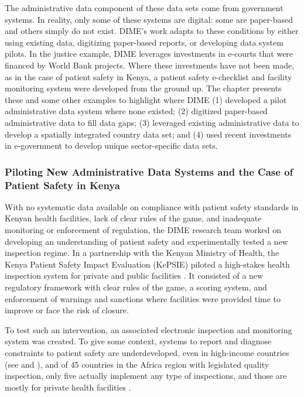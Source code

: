 The administrative data component of these data sets come from government systems. In reality, only some of these systems are digital: some are paper-based and others simply do not exist. DIME's work adapts to these conditions by either using existing data, digitizing paper-based reports, or developing data system pilots. In the justice example, DIME leverages investments in e-courts that were financed by World Bank projects. Where these investments have not been made, as in the case of patient safety in Kenya, a patient safety e-checklist and facility monitoring system were developed from the ground up. The chapter presents these and some other examples to highlight where DIME (1) developed a pilot administrative data system where none existed; (2) digitized paper-based administrative data to fill data gaps; (3) leveraged existing administrative data to develop a spatially integrated country data set; and (4) used recent investments in e-government to develop unique sector-specific data sets.\newpage

\hypertarget{piloting-new-administrative-data-systems-and-the-case-of-patient-safety-in-kenya}{%
\subsubsection{Piloting New Administrative Data Systems and the Case of Patient Safety in Kenya}\label{piloting-new-administrative-data-systems-and-the-case-of-patient-safety-in-kenya}}

With no systematic data available on compliance with patient safety standards in Kenyan health facilities, lack of clear rules of the game, and inadequate monitoring or enforcement of regulation, the DIME research team worked on developing an understanding of patient safety and experimentally tested a new inspection regime. In a partnership with the Kenyan Ministry of Health, the Kenya Patient Safety Impact Evaluation (KePSIE) piloted a high-stakes health inspection system for private and public facilities \citep[see][]{bedoyaforthcoming}. It consisted of a new regulatory framework with clear rules of the game, a scoring system, and enforcement of warnings and sanctions where facilities were provided time to improve or face the risk of closure. 

To test such an intervention, an associated electronic inspection and monitoring system was created. To give some context, systems to report and diagnose constraints to patient safety are underdeveloped, even in high-income countries (see \citet{wachter2010} and \citet{longo2005}), and of 45 countries in the Africa region with legislated quality inspection, only five actually implement any type of inspections, and those are mostly for private health facilities \citep{spreng2011}. 

